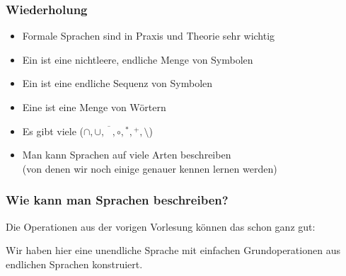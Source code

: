 \documentclass[onlymath]{beamer}
\begin{document}
\maketitle


\begin{frame}\frametitle{Wiederholung}

\begin{itemize}
\item Formale Sprachen sind in Praxis und Theorie sehr wichtig
\item Ein  ist eine nichtleere, endliche Menge von Symbolen
\item Ein  ist eine endliche Sequenz von Symbolen
\item Eine  ist eine Menge von Wörtern
\item Es gibt viele  ($\cap, \cup, \overline{\phantom{L}}, \circ, {}^*, {}^+, \setminus$)
\item Man kann Sprachen auf viele Arten beschreiben\\
(von denen wir noch einige genauer kennen lernen werden)
\end{itemize}

\end{frame}


\begin{frame}\frametitle{Wie kann man Sprachen beschreiben?}

Die Operationen aus der vorigen Vorlesung können das schon ganz gut:
\medskip

\bigskip

Wir haben hier eine unendliche Sprache mit einfachen Grundoperationen aus endlichen Sprachen konstruiert.
\bigskip


\end{frame}
\end{document}
